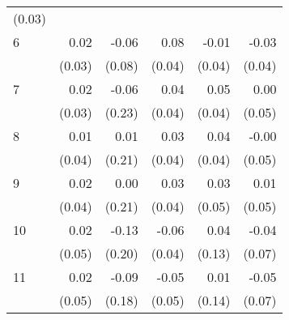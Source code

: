 \begin{tabular}{llllll}
  \multicolumn{1}{r}{(0.03)} \\
\multicolumn{1}{l}{6} &
  \multicolumn{1}{|r}{0.02} &
  \multicolumn{1}{r}{-0.06} &
  \multicolumn{1}{r}{0.08} &
  \multicolumn{1}{r}{-0.01} &
  \multicolumn{1}{r}{-0.03} \\
\multicolumn{1}{l}{} &
  \multicolumn{1}{|r}{(0.03)} &
  \multicolumn{1}{r}{(0.08)} &
  \multicolumn{1}{r}{(0.04)} &
  \multicolumn{1}{r}{(0.04)} &
  \multicolumn{1}{r}{(0.04)} \\
\multicolumn{1}{l}{7} &
  \multicolumn{1}{|r}{0.02} &
  \multicolumn{1}{r}{-0.06} &
  \multicolumn{1}{r}{0.04} &
  \multicolumn{1}{r}{0.05} &
  \multicolumn{1}{r}{0.00} \\
\multicolumn{1}{l}{} &
  \multicolumn{1}{|r}{(0.03)} &
  \multicolumn{1}{r}{(0.23)} &
  \multicolumn{1}{r}{(0.04)} &
  \multicolumn{1}{r}{(0.04)} &
  \multicolumn{1}{r}{(0.05)} \\
\multicolumn{1}{l}{8} &
  \multicolumn{1}{|r}{0.01} &
  \multicolumn{1}{r}{0.01} &
  \multicolumn{1}{r}{0.03} &
  \multicolumn{1}{r}{0.04} &
  \multicolumn{1}{r}{-0.00} \\
\multicolumn{1}{l}{} &
  \multicolumn{1}{|r}{(0.04)} &
  \multicolumn{1}{r}{(0.21)} &
  \multicolumn{1}{r}{(0.04)} &
  \multicolumn{1}{r}{(0.04)} &
  \multicolumn{1}{r}{(0.05)} \\
\multicolumn{1}{l}{9} &
  \multicolumn{1}{|r}{0.02} &
  \multicolumn{1}{r}{0.00} &
  \multicolumn{1}{r}{0.03} &
  \multicolumn{1}{r}{0.03} &
  \multicolumn{1}{r}{0.01} \\
\multicolumn{1}{l}{} &
  \multicolumn{1}{|r}{(0.04)} &
  \multicolumn{1}{r}{(0.21)} &
  \multicolumn{1}{r}{(0.04)} &
  \multicolumn{1}{r}{(0.05)} &
  \multicolumn{1}{r}{(0.05)} \\
\multicolumn{1}{l}{10} &
  \multicolumn{1}{|r}{0.02} &
  \multicolumn{1}{r}{-0.13} &
  \multicolumn{1}{r}{-0.06} &
  \multicolumn{1}{r}{0.04} &
  \multicolumn{1}{r}{-0.04} \\
\multicolumn{1}{l}{} &
  \multicolumn{1}{|r}{(0.05)} &
  \multicolumn{1}{r}{(0.20)} &
  \multicolumn{1}{r}{(0.04)} &
  \multicolumn{1}{r}{(0.13)} &
  \multicolumn{1}{r}{(0.07)} \\
\multicolumn{1}{l}{11} &
  \multicolumn{1}{|r}{0.02} &
  \multicolumn{1}{r}{-0.09} &
  \multicolumn{1}{r}{-0.05} &
  \multicolumn{1}{r}{0.01} &
  \multicolumn{1}{r}{-0.05} \\
\multicolumn{1}{l}{} &
  \multicolumn{1}{|r}{(0.05)} &
  \multicolumn{1}{r}{(0.18)} &
  \multicolumn{1}{r}{(0.05)} &
  \multicolumn{1}{r}{(0.14)} &
  \multicolumn{1}{r}{(0.07)} \\

\end{tabular}
